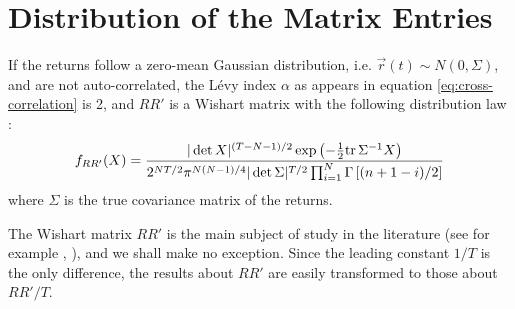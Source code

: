\documentclass{book}
\begin{document}
\section{Distribution of the Matrix Entries}\label{sec:GCC-analytical}
If the returns follow a zero-mean Gaussian distribution, 
i.e. $\vec{r}(t) \sim N(0, \Sigma)$, and are not
auto-correlated, the L\'evy index $\alpha$ as appears in equation
\ref{eq:cross-correlation} is 2, and $RR'$ is a Wishart matrix with
the following distribution law \cite{Anderson2003}:
\begin{equation}
  \label{eq:WishartPDF}
  f_{RR'}(X) = { |\det X|^{(T-N-1)/2} \exp\left(-{1 \over 2}\text{tr}\,
      \Sigma^{-1}X \right)
    \over
    2^{NT/2}\pi^{N(N-1)/4}|\det \Sigma|^{T/2}
    \prod_{i=1}^N \Gamma\left[(n+1-i)/2\right]
  }
\end{equation}
where $\Sigma$ is the true covariance matrix of the returns.

The Wishart matrix $RR'$ is the main subject of study in the
literature (see for example \cite{Anderson2003}, \cite{Chiani2012}),
and we shall make no exception. Since the leading constant $1/T$ is
the only difference, the results about $RR'$ are easily transformed
to those about $RR'/T$.
\end{document}
